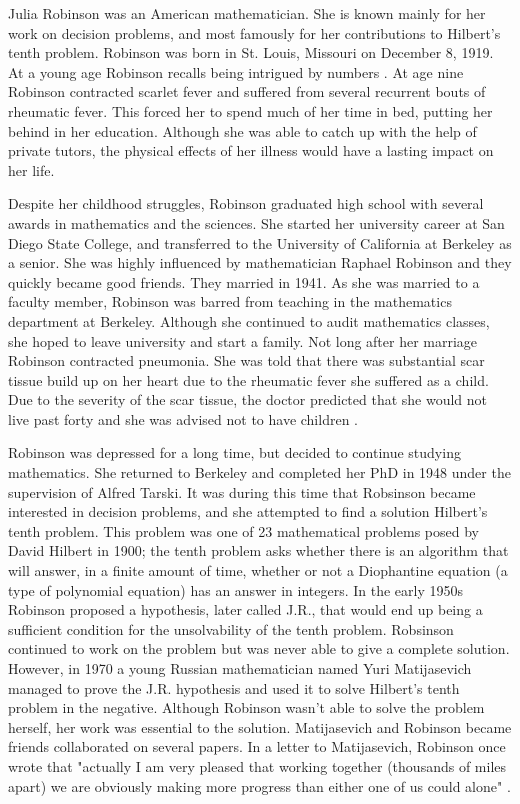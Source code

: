\documentclass[../../../include/open-logic-section]{subfiles}
\begin{document}



Julia Robinson was an American mathematician. She is known mainly for her
work on decision problems, and most famously for her contributions to
Hilbert's tenth problem. Robinson was born in St. Louis, Missouri on
December 8, 1919. At a young age Robinson recalls being intrigued by
numbers \citep[4]{Reid1986}. At age nine Robinson contracted scarlet fever
and suffered from several recurrent bouts of rheumatic fever. This forced
her to spend much of her time in bed, putting her behind in her education.
Although she was able to catch up with the help of private tutors, the
physical effects of her illness would have a lasting impact on her life.

Despite her childhood struggles, Robinson graduated high school with
several awards in mathematics and the sciences. She started her university
career at San Diego State College, and transferred to the University of
California at Berkeley as a senior. She was highly influenced by
mathematician Raphael Robinson and they quickly became good friends. They
married in 1941. As she was married to a faculty member, Robinson was
barred from teaching in the mathematics department at Berkeley. Although
she continued to audit mathematics classes, she hoped to leave university
and start a family. Not long after her marriage Robinson contracted
pneumonia. She was told that there was substantial scar tissue build up on
her heart due to the rheumatic fever she suffered as a child. Due to the
severity of the scar tissue, the doctor predicted that she would not live
past forty and she was advised not to have children \citep[13]{Reid1986}.

Robinson was depressed for a long time, but decided to continue studying
mathematics. She returned to Berkeley and completed her PhD in 1948 under
the supervision of Alfred Tarski. It was during this time that Robsinson
became interested in decision problems, and she attempted to find a
solution Hilbert's tenth problem. This problem was one of 23 mathematical
problems posed by David Hilbert in 1900; the tenth problem asks whether
there is an algorithm that will answer, in a finite amount of time, whether
or not a Diophantine equation (a type of polynomial equation) has an answer
in integers. In the early 1950s Robinson proposed a hypothesis, later
called J.R., that would end up being a sufficient condition for the
unsolvability of the tenth problem. Robsinson continued to work on the
problem but was never able to give a complete solution. However, in 1970 a
young Russian mathematician named Yuri Matijasevich managed to prove the
J.R. hypothesis and used it to solve Hilbert's tenth problem in the
negative. Although Robinson wasn't able to solve the problem herself, her
work was essential to the solution. Matijasevich and Robinson became
friends collaborated on several papers. In a letter to Matijasevich,
Robinson once wrote that "actually I am very pleased that working together
(thousands of miles apart) we are obviously making more progress than
either one of us could alone" \citep[45]{Matijasevich1992}.
\end{document}
